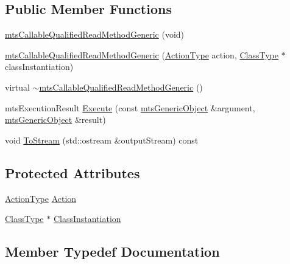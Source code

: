 \subsection*{Public Member Functions}
\begin{DoxyCompactItemize}
\item 
\hyperlink{classmts_callable_qualified_read_method_generic_a37061746218d1cec908ce78393d4fe56}{mts\+Callable\+Qualified\+Read\+Method\+Generic} (void)
\item 
\hyperlink{classmts_callable_qualified_read_method_generic_a952cdaf09a287de112a758b9f5c36c20}{mts\+Callable\+Qualified\+Read\+Method\+Generic} (\hyperlink{classmts_callable_qualified_read_method_generic_afe3373d95d9a97f9737078e041f945d8}{Action\+Type} action, \hyperlink{classmts_callable_qualified_read_method_generic_ada2d394b00a2db849dd5d67b965fd63b}{Class\+Type} $\ast$class\+Instantiation)
\item 
virtual \hyperlink{classmts_callable_qualified_read_method_generic_a98261d23e50a97a2923ee04f8ffd193a}{$\sim$mts\+Callable\+Qualified\+Read\+Method\+Generic} ()
\item 
mts\+Execution\+Result \hyperlink{classmts_callable_qualified_read_method_generic_a489b1a5368c0e7533f634830723fe0af}{Execute} (const \hyperlink{classmts_generic_object}{mts\+Generic\+Object} \&argument, \hyperlink{classmts_generic_object}{mts\+Generic\+Object} \&result)
\item 
void \hyperlink{classmts_callable_qualified_read_method_generic_a7c8f5ed8525397fdfeda642e0d3888d1}{To\+Stream} (std\+::ostream \&output\+Stream) const 
\end{DoxyCompactItemize}
\subsection*{Protected Attributes}
\begin{DoxyCompactItemize}
\item 
\hyperlink{classmts_callable_qualified_read_method_generic_afe3373d95d9a97f9737078e041f945d8}{Action\+Type} \hyperlink{classmts_callable_qualified_read_method_generic_a39b88372b35325f8ed51a406e42b9c51}{Action}
\item 
\hyperlink{classmts_callable_qualified_read_method_generic_ada2d394b00a2db849dd5d67b965fd63b}{Class\+Type} $\ast$ \hyperlink{classmts_callable_qualified_read_method_generic_aa2cc99ad37b816f02a8287a26e3f22b0}{Class\+Instantiation}
\end{DoxyCompactItemize}


\subsection{Member Typedef Documentation}
\hypertarget{classmts_callable_qualified_read_method_generic_afe3373d95d9a97f9737078e041f945d8}{}
